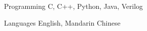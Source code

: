 

\begin{cvskills}




  \cvskill
    {Programming} %
    {C, C++, Python, Java, Verilog} %

  \cvskill
    {Languages} %
    {English, Mandarin Chinese} %

\end{cvskills}
